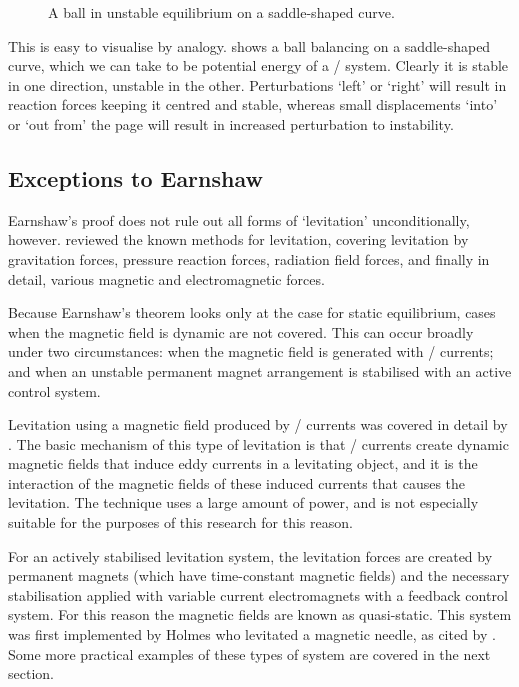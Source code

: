 \begin{figure}
  \caption{A ball in unstable equilibrium on a saddle-shaped curve.}
\end{figure}

This is easy to visualise by analogy.
 shows a ball balancing
on a saddle-shaped curve, which we can take to be potential energy of a \twoD/
system.
Clearly it is stable in one direction, unstable in the other.
Perturbations `left' or `right' will result in reaction forces keeping it
centred and stable, whereas small displacements `into' or `out from' the page
will result in increased perturbation to instability.

\subsection{Exceptions to Earnshaw}

Earnshaw's proof does not rule out all forms of `levitation' unconditionally,
however.
\textcite{boerdijk1956a} reviewed the known methods for levitation,
covering levitation by gravitation forces, pressure reaction forces, radiation
field forces, and finally in detail, various magnetic and electromagnetic
forces.

Because Earnshaw's theorem looks only at the case for static equilibrium,
cases when the magnetic field is dynamic are not covered.
This can occur
broadly under two circumstances: when the magnetic field is generated with
\AC/ currents; and when an unstable permanent magnet arrangement is stabilised
with an active control system.

Levitation using a magnetic field produced by \AC/ currents was covered in
detail by \textcite{laithwaite1965}.
The basic mechanism of this type of
levitation is that \AC/ currents create dynamic magnetic fields that induce
eddy currents in a levitating object, and it is the interaction of the
magnetic fields of these induced currents that causes the levitation.
The
technique uses a large amount of power, and is not especially suitable for the
purposes of this research for this reason.

For an actively stabilised levitation system, the levitation forces are
created by permanent magnets (which have time-constant magnetic fields) and
the necessary stabilisation applied with variable current electromagnets with
a feedback control system.
For this reason the magnetic fields are known as
quasi-static.
This system was first implemented by Holmes who levitated a
magnetic needle, as cited by \textcite{boerdijk1956a}.
Some more practical
examples of these types of system are covered in the next section.

